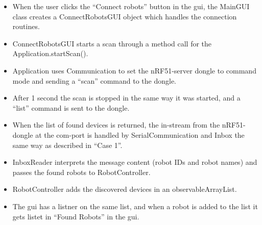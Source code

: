 \begin{itemize}
    \item When the user clicks the ``Connect robots'' button in the \acrshort{gui}, the MainGUI class creates a ConnectRobotsGUI object which handles the connection routines.
    \item ConnectRobotsGUI starts a scan through a method call for the Application.startScan().
    \item Application uses Communication to set the nRF51-server dongle to command mode and sending a ``scan'' command to the dongle.
    \item After 1 second the scan is stopped in the same way it was started, and a ``list'' command is sent to the dongle.
    \item When the list of found devices is returned, the in-stream from the nRF51-dongle at the \acrshort{com}-port is handled by SerialCommunication and Inbox the same way as described in ``Case 1''.
    \item InboxReader interprets the message content (robot IDs and robot names) and passes the found robots to RobotController.
    \item RobotController adds the discovered devices in an observableArrayList.
    \item The \acrshort{gui} has a listner on the same list, and when a robot is added to the list it gets listet in ``Found Robots'' in the \acrshort{gui}.
\end{itemize}
\vspace*{20pt}
